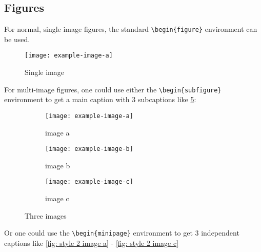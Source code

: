\subsection{Figures}
For normal, single image figures, the standard \texttt{\textbackslash begin\{figure\}} environment can be used. 

\begin{figure}[h]
    \centering
    \texttt{[image: example-image-a]}
    \label{fig: style 0 image a}
    \caption{Single image}
\end{figure}


For multi-image figures, one could use either the \texttt{\textbackslash begin\{subfigure\}} environment to get a main caption with 3 subcaptions like \cref{fig: three images}:

\begin{figure}[h]
     \centering
     \begin{subfigure}[b]{0.3\textwidth}
         \centering
         \texttt{[image: example-image-a]}
         \caption{image a}
         \label{fig: style 1 image a}
     \end{subfigure}
     \hfill
     \begin{subfigure}[b]{0.3\textwidth}
         \centering
         \texttt{[image: example-image-b]}
         \caption{image b}
         \label{fig: style 1 image b}
     \end{subfigure}
     \hfill
     \begin{subfigure}[b]{0.3\textwidth}
         \centering
         \texttt{[image: example-image-c]}
         \caption{image c}
         \label{fig: style 1 image c}
     \end{subfigure}
        \caption{Three images}
        \label{fig: three images}
\end{figure}


 Or one could use the \texttt{\textbackslash begin\{minipage\}} environment to get 3 independent captions like \cref{fig: style 2 image a} - \ref{fig: style 2 image c}

